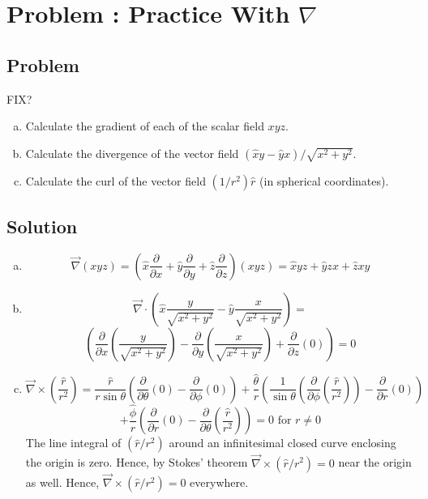 \documentclass[solutions]{esg8022pset}
\date{\today }
\newcommand{\Kgrad}{\left(\hat{x} \frac{\partial}{\partial x} + \hat{y} \frac{\partial}{\partial y} + \hat{z} \frac{\partial}{\partial z}\right)}
\newcommand{\KKdiv}[6]{{#4}\left(\frac{\partial}{\partial x}{#1} {#5} \frac{\partial}{\partial y}{#2} {#6}\frac{\partial}{\partial z}{#3} \right)}
\begin{document}
\section{Problem \thesection: Practice With $\nabla $}
\subsection{Problem}
FIX?
  \begin{enumerate}[(a)]
    \item Calculate the gradient of each of the scalar field $xyz$.
    \item Calculate the divergence of the vector field $(\hat{x} y - \hat{y} x) / \sqrt{x^2 + y^2}$.
    \item Calculate the curl of the vector field $(1/r^2)\hat{r}$ (in spherical coordinates).
  \end{enumerate}
\subsection{Solution}
  \begin{enumerate}[(a)]
    \item $$\vec\nabla (xyz) = \Kgrad (xyz) = \hat x yz + \hat y zx + \hat z xy$$
    \item $$\vec{\nabla}\cdot \left(\hat{x} \frac{y}{\sqrt{x^2+y^2}} - \hat{y} \frac{x}{\sqrt{x^2+y^2}}\right) = $$ $$\KKdiv{\left(\frac{y}{\sqrt{x^2+y^2}}\right)}{\left(\frac{x}{\sqrt{x^2+y^2}}\right)}{(0)}{}{-}{+} = 0$$
    \item $${\vec{\nabla} \times \left( \frac{\hat r}{r^2} \right)} = \frac{\hat r}{r \sin \theta} \left( \frac{\partial}{\partial \theta} \left( 0 \right) - \frac{\partial}{\partial \phi} \left( 0 \right)\right) + \frac{\hat\theta}{r} \left( \frac{1}{\sin \theta} \left( \frac{\partial}{\partial \phi} \left(\frac{\hat r}{r^{2}} \right) \right)-   \frac{\partial}{\partial r} \left( 0 \right) \right)$$ $$+  \frac{\hat\phi}{r} \left( \frac{\partial}{\partial r} \left( 0 \right) - \frac{\partial}{\partial \theta} \left( \frac{\hat r}{r^{2}}\right) \right) = 0\text{ for }r \neq 0$$
      The line integral of $\left( \hat r / r^2 \right)$ around an infinitesimal closed curve enclosing the origin is zero. Hence, by Stokes' theorem $\vec{\nabla}\times\left({\hat r/r^2}\right) = 0$ near the origin as well. Hence, ${\vec{\nabla} \times \left( { \hat r / r^2} \right)} = 0$ everywhere.
  \end{enumerate}
\end{document}
